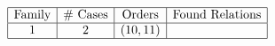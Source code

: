 \begin{table}[h]
	\centering
	$\begin{array}{|c|c|c|c|}
		\hline
		\text{Family} & \text{\# Cases} & \text{Orders} & \text{Found Relations} \\
		\hline
		1 & 2 & (10, 11) &  \\
		\hline
	\end{array}$
\end{table}
